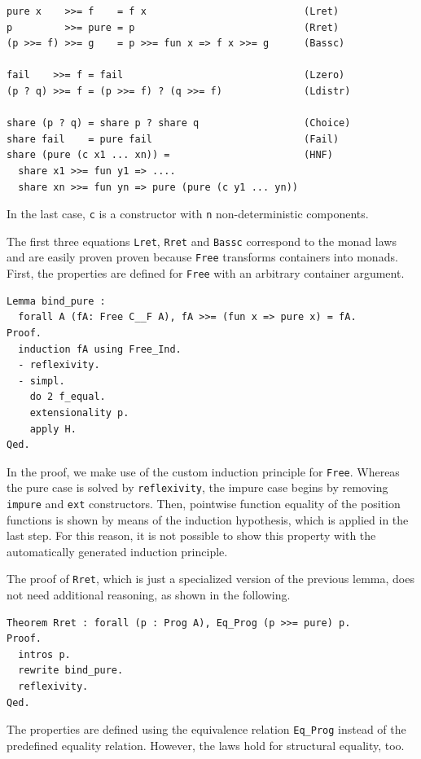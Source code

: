 \documentclass[a4paper, 11pt, fleqn, twoside]{scrreprt}
\newcommand{\cinl}[1]{\texttt{#1}}
\begin{document}
\begin{verbatim}
pure x    >>= f    = f x                           (Lret)
p         >>= pure = p                             (Rret)
(p >>= f) >>= g    = p >>= fun x => f x >>= g      (Bassc)

fail    >>= f = fail                               (Lzero)
(p ? q) >>= f = (p >>= f) ? (q >>= f)              (Ldistr)

share (p ? q) = share p ? share q                  (Choice)
share fail    = pure fail                          (Fail)
share (pure (c x1 ... xn)) =                       (HNF)
  share x1 >>= fun y1 => ....
  share xn >>= fun yn => pure (pure (c y1 ... yn))
\end{verbatim}

In the last case, \cinl{c} is a constructor with \cinl{n} non-deterministic components.

The first three equations \cinl{Lret}, \cinl{Rret} and \cinl{Bassc} correspond to the monad laws and are easily proven proven because \cinl{Free} transforms containers into monads.
First, the properties are defined for \cinl{Free} with an arbitrary container argument.

\begin{verbatim}
Lemma bind_pure :
  forall A (fA: Free C__F A), fA >>= (fun x => pure x) = fA.
Proof.
  induction fA using Free_Ind.
  - reflexivity.
  - simpl.
    do 2 f_equal.
    extensionality p.
    apply H.
Qed.
\end{verbatim}

In the proof, we make use of the custom induction principle for \cinl{Free}.
Whereas the pure case is solved by \cinl{reflexivity}, the impure case begins by removing \cinl{impure} and \cinl{ext} constructors.
Then, pointwise function equality of the position functions is shown by means of the induction hypothesis, which is applied in the last step.
For this reason, it is not possible to show this property with the automatically generated induction principle.

The proof of \cinl{Rret}, which is just a specialized version of the previous lemma, does not need additional reasoning, as shown in the following.

\begin{verbatim}
Theorem Rret : forall (p : Prog A), Eq_Prog (p >>= pure) p.
Proof.
  intros p.
  rewrite bind_pure.
  reflexivity.
Qed.
\end{verbatim}

The properties are defined using the equivalence relation \cinl{Eq_Prog} instead of the predefined equality relation.
However, the laws hold for structural equality, too.
\end{document}
